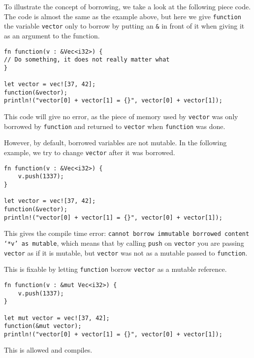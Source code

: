 To illustrate the concept of borrowing, we take a look at the following piece code. The code is almost the same as the example above, but here we give \verb|function| the variable \verb|vector| only to borrow by putting an \verb|&| in front of it when giving it as an argument to the function. 

\begin{verbatim}
fn function(v : &Vec<i32>) {
// Do something, it does not really matter what
}

let vector = vec![37, 42];
function(&vector);
println!("vector[0] + vector[1] = {}", vector[0] + vector[1]);
\end{verbatim}

This code will give no error, as the piece of memory used by \verb|vector| was only borrowed by \verb|function| and returned to \verb|vector| when \verb|function| was done. 

However, by default, borrowed variables are not mutable. In the following example, we try to change \verb|vector| after it was borrowed. 

\begin{verbatim}
fn function(v : &Vec<i32>) {
    v.push(1337);
}

let vector = vec![37, 42];
function(&vector);
println!("vector[0] + vector[1] = {}", vector[0] + vector[1]);
\end{verbatim}

This gives the compile time error: \texttt{cannot borrow immutable borrowed content `*v' as mutable}, which means that by calling \verb|push| on \verb|vector| you are passing \verb|vector| as if it is mutable, but \verb|vector| was not as a mutable passed to \verb|function|. 

This is fixable by letting \verb|function| borrow \verb|vector| as a mutable reference. 

\begin{verbatim}
fn function(v : &mut Vec<i32>) {
    v.push(1337);
}

let mut vector = vec![37, 42];
function(&mut vector);
println!("vector[0] + vector[1] = {}", vector[0] + vector[1]);
\end{verbatim}

This is allowed and compiles. 

